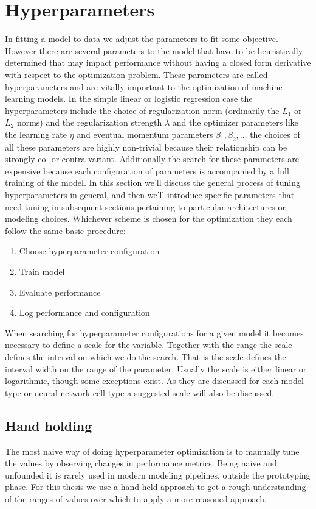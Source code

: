 \section{Hyperparameters}\label{sec:hyperparams}

In fitting a model to data we adjust the parameters to fit some objective. However there are several parameters to the model that have to be heuristically determined that may impact performance without having a closed form derivative with respect to the optimization problem. These parameters are called hyperparameters and are vitally important to the optimization of machine learning models. In the simple linear or logistic regression case the hyperparameters include the choice of regularization norm (ordinarily the $L_1$ or $L_2$ norms) and the regularization strength $\lambda$ and the optimizer parameters like the learning rate $\eta$ and eventual momentum parameters $\beta_1, \beta_2, \dots$ the choices of all these parameters are highly non-trivial because their relationship can be strongly co- or contra-variant. Additionally the search for these parameters are expensive because each configuration of parameters is accompanied by a full training of the model. In this section we'll discuss the general process of tuning hyperparameters in general, and then we'll introduce specific parameters that need tuning in subsequent sections pertaining to particular architectures or modeling choices. Whichever scheme is chosen for the optimization they each follow the same basic procedure:

\begin{enumerate}
\item Choose hyperparameter configuration
\item Train model
\item Evaluate performance
\item Log performance and configuration
\end{enumerate}

\noindent When searching for hyperparameter configurations for a given model it becomes necessary to define a scale for the variable. Together with the range the scale defines the interval on which we do the search. That is the scale defines the interval width on the range of the parameter. Usually the scale is either linear or logarithmic, though some exceptions exist. As they are discussed for each model type or neural network cell type a suggested scale will also be discussed.

\subsection{Hand holding}
The most naive way of doing hyperparameter optimization is to manually tune the values by observing changes in performance metrics. Being naive and unfounded it is rarely used in modern modeling pipelines, outside the prototyping phase. For this thesis we use a hand held approach to get a rough understanding of the ranges of values over which to apply a more reasoned approach. 

